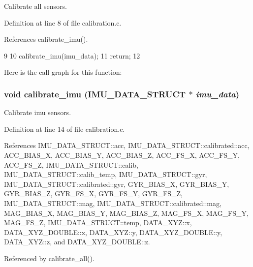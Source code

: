 Calibrate all sensors. 



Definition at line 8 of file calibration.c.



References calibrate\_\-imu().




\begin{DoxyCode}
9 {
10   calibrate_imu(imu_data);
11   return;
12 }
\end{DoxyCode}




Here is the call graph for this function:

\hypertarget{group__calibrate_gaecfc81d152db2843b5d1517729804d63}{
\subsubsection[{calibrate\_\-imu}]{\setlength{\rightskip}{0pt plus 5cm}void calibrate\_\-imu ({\bf IMU\_\-DATA\_\-STRUCT} $\ast$ {\em imu\_\-data})}}
\label{group__calibrate_gaecfc81d152db2843b5d1517729804d63}


Calibrate imu sensors. 



Definition at line 14 of file calibration.c.



References IMU\_\-DATA\_\-STRUCT::acc, IMU\_\-DATA\_\-STRUCT::calibrated::acc, ACC\_\-BIAS\_\-X, ACC\_\-BIAS\_\-Y, ACC\_\-BIAS\_\-Z, ACC\_\-FS\_\-X, ACC\_\-FS\_\-Y, ACC\_\-FS\_\-Z, IMU\_\-DATA\_\-STRUCT::calib, IMU\_\-DATA\_\-STRUCT::calib\_\-temp, IMU\_\-DATA\_\-STRUCT::gyr, IMU\_\-DATA\_\-STRUCT::calibrated::gyr, GYR\_\-BIAS\_\-X, GYR\_\-BIAS\_\-Y, GYR\_\-BIAS\_\-Z, GYR\_\-FS\_\-X, GYR\_\-FS\_\-Y, GYR\_\-FS\_\-Z, IMU\_\-DATA\_\-STRUCT::mag, IMU\_\-DATA\_\-STRUCT::calibrated::mag, MAG\_\-BIAS\_\-X, MAG\_\-BIAS\_\-Y, MAG\_\-BIAS\_\-Z, MAG\_\-FS\_\-X, MAG\_\-FS\_\-Y, MAG\_\-FS\_\-Z, IMU\_\-DATA\_\-STRUCT::temp, DATA\_\-XYZ::x, DATA\_\-XYZ\_\-DOUBLE::x, DATA\_\-XYZ::y, DATA\_\-XYZ\_\-DOUBLE::y, DATA\_\-XYZ::z, and DATA\_\-XYZ\_\-DOUBLE::z.



Referenced by calibrate\_\-all().




